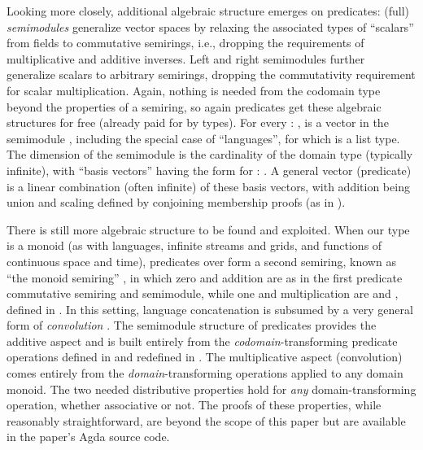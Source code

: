 \documentclass[acmsmall,screen,anonymous,timestamp]{acmart}
\begin{document}
Looking more closely, additional algebraic structure emerges on predicates: (full) \emph{semimodules} generalize vector spaces by relaxing the associated types of ``scalars'' from fields to commutative semirings, i.e., dropping the requirements of multiplicative and additive inverses.
Left and right semimodules further generalize scalars to arbitrary semirings, dropping the commutativity requirement for scalar multiplication.
Again, nothing is needed from the codomain type  beyond the properties of a semiring, so again predicates get these algebraic structures for free (already paid for by types).
For every { \AS :  },  is a vector in the semimodule { }, including the special case of ``languages'', for which  is a list type.
The dimension of the semimodule is the cardinality of the domain type  (typically infinite), with ``basis vectors'' having the form { } for { \AS : }.
A general vector (predicate) is a linear combination (often infinite) of these basis vectors, with addition being union and scaling defined by conjoining membership proofs (as in ).

There is still more algebraic structure to be found and exploited.
When our  type  is a monoid (as with languages, infinite streams and grids, and functions of continuous space and time), predicates over  form a second semiring, known as ``the monoid semiring'' \citep{Golan2005RecentSemi}, in which zero and addition are as in the first predicate commutative semiring and semimodule, while one and multiplication are  and , defined in .
In this setting, language concatenation is subsumed by a very general form of \emph{convolution} \cite{Golan2005RecentSemi, Dongol2016CUC, Elliott2019-convolution}.
The semimodule structure of predicates provides the additive aspect and is built entirely from the \emph{codomain}-transforming predicate operations defined in  and redefined in .
The multiplicative aspect (convolution) comes entirely from the \emph{domain}-transforming operations applied to any domain monoid.
The two needed distributive properties hold for \emph{any} domain-transforming operation, whether associative or not.
The proofs of these properties, while reasonably straightforward, are beyond the scope of this paper but are available in the paper's Agda source code.
\end{document}

